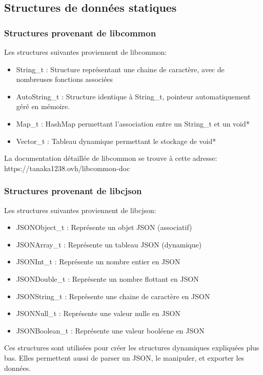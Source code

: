 % 
\subsection{Structures de données statiques}
\subsubsection{Structures provenant de libcommon}
Les structures suivantes proviennent de libcommon:
\begin{itemize}
	\item String\_t : Structure représentant une chaine de caractère, avec de nombreuses fonctions associées
	\item AutoString\_t : Structure identique à String\_t, pointeur automatiquement géré en mémoire.
	\item Map\_t : HashMap permettant l'association entre un String\_t et un void*
	\item Vector\_t : Tableau dynamique permettant le stockage de void*
\end{itemize}
La documentation détaillée de libcommon se trouve à cette adresse:\newline
https://tanaka1238.ovh/libcommon-doc
\par
\subsubsection{Structures provenant de libcjson}
Les structures suivantes proviennent de libcjson:
\begin{itemize}
	\item JSONObject\_t : Représente un objet JSON (associatif)
	\item JSONArray\_t : Représente un tableau JSON (dynamique)
	\item JSONInt\_t : Représente un nombre entier en JSON
	\item JSONDouble\_t : Représente un nombre flottant en JSON
	\item JSONString\_t : Représente une chaine de caractère en JSON
	\item JSONNull\_t : Représente une valeur nulle en JSON
	\item JSONBoolean\_t : Représente une valeur booléene en JSON
\end{itemize}
Ces structures sont utilisées pour créer les structures dynamiques expliquées plus bas.
Elles permettent aussi de parser un JSON, le manipuler, et exporter les données.\par

